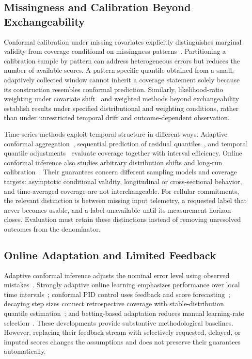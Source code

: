 \subsection{Missingness and Calibration Beyond Exchangeability}
Conformal calibration under missing covariates explicitly distinguishes marginal validity from coverage conditional on missingness patterns~\cite{zaffran2023}. Partitioning a calibration sample by pattern can address heterogeneous errors but reduces the number of available scores. A pattern-specific quantile obtained from a small, adaptively collected window cannot inherit a coverage statement solely because its construction resembles conformal prediction. Similarly, likelihood-ratio weighting under covariate shift~\cite{tibshirani2019} and weighted methods beyond exchangeability~\cite{barber2023} establish results under specified distributional and weighting conditions, rather than under unrestricted temporal drift and outcome-dependent observation.

Time-series methods exploit temporal structure in different ways. Adaptive conformal aggregation~\cite{zaffran2022}, sequential prediction of residual quantiles~\cite{xu2023}, and temporal quantile adjustments~\cite{lin2022} evaluate coverage together with interval efficiency. Online conformal inference also studies arbitrary distribution shifts and long-run calibration~\cite{gibbs2024}. Their guarantees concern different sampling models and coverage targets: asymptotic conditional validity, longitudinal or cross-sectional behavior, and time-averaged coverage are not interchangeable. For cellular commitments, the relevant distinction is between missing input telemetry, a requested label that never becomes usable, and a label unavailable until its measurement horizon closes. Evaluation must retain these distinctions instead of removing unresolved outcomes from the denominator.

\subsection{Online Adaptation and Limited Feedback}
Adaptive conformal inference adjusts the nominal error level using observed mistakes~\cite{gibbs2021}. Strongly adaptive online learning emphasizes performance over local time intervals~\cite{bhatnagar2023}; conformal PID control uses feedback and score forecasting~\cite{pid2023}; decaying step sizes connect retrospective coverage with stable-distribution quantile estimation~\cite{angelopoulos2024online}; and betting-based adaptation reduces manual learning-rate selection~\cite{podkopaev2024}. These developments provide substantive methodological baselines. However, replacing their feedback stream with selectively requested, delayed, or imputed scores changes the assumptions and does not preserve their guarantees automatically.

